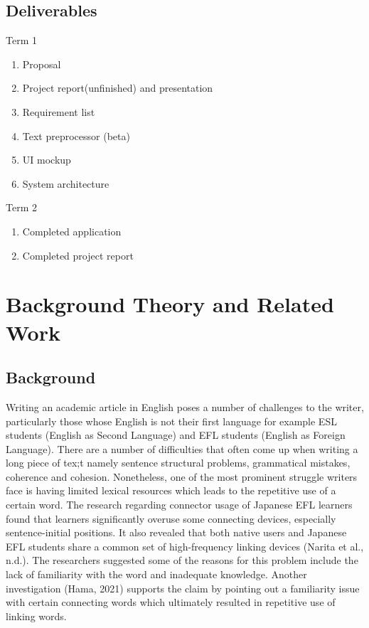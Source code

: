 \documentclass[12pt,oneside,openright,a4paper]{cpe-english-project}
\begin{document}
\section{Deliverables}
Term 1
\begin{enumerate}
\item Proposal
\item Project report(unfinished) and presentation
\item Requirement list
\item Text preprocessor (beta)
\item UI mockup
\item System architecture\\
\end{enumerate}

Term 2
\begin{enumerate}
\item Completed application
\item Completed project report
\end{enumerate}


\chapter{Background Theory and Related Work}
\section{Background}
Writing an academic article in English poses a number of challenges to the writer, particularly those whose English is not their first language for example ESL students (English as Second Language) and EFL students (English as Foreign Language). There are a number of difficulties that often come up when writing a long piece of tex;t namely sentence structural problems, grammatical mistakes, coherence and cohesion. Nonetheless, one of the most prominent struggle writers face is having limited lexical resources which leads to the repetitive use of a certain word. The research regarding connector usage of Japanese EFL learners found that learners significantly overuse some connecting devices, especially sentence-initial positions. It also revealed that both native users and Japanese EFL students share a common set of high-frequency linking devices (Narita et al., n.d.). The researchers suggested some of the reasons for this problem include the lack of familiarity with the word and inadequate knowledge. Another investigation (Hama, 2021) supports the claim by pointing out a familiarity issue with certain connecting words which ultimately resulted in repetitive use of linking words. 
\end{document}
